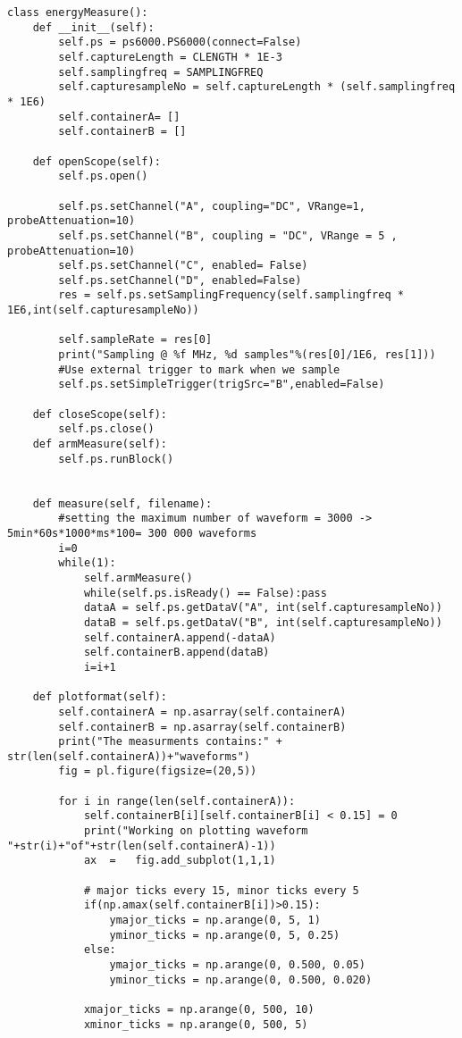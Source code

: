 \begin{appendices}
\begin{lstlisting}
class energyMeasure():
	def __init__(self):
		self.ps = ps6000.PS6000(connect=False)
		self.captureLength = CLENGTH * 1E-3
		self.samplingfreq = SAMPLINGFREQ
		self.capturesampleNo = self.captureLength * (self.samplingfreq * 1E6)
		self.containerA= []
		self.containerB = []
	
	def openScope(self):
		self.ps.open()

		self.ps.setChannel("A", coupling="DC", VRange=1, probeAttenuation=10)
		self.ps.setChannel("B", coupling = "DC", VRange = 5 , probeAttenuation=10)
		self.ps.setChannel("C", enabled= False)
		self.ps.setChannel("D", enabled=False)
		res = self.ps.setSamplingFrequency(self.samplingfreq * 1E6,int(self.capturesampleNo))

		self.sampleRate = res[0]
		print("Sampling @ %f MHz, %d samples"%(res[0]/1E6, res[1]))
		#Use external trigger to mark when we sample
		self.ps.setSimpleTrigger(trigSrc="B",enabled=False)

	def closeScope(self):
		self.ps.close()
	def armMeasure(self):
		self.ps.runBlock()


	def measure(self, filename):
		#setting the maximum number of waveform = 3000 -> 5min*60s*1000*ms*100= 300 000 waveforms
		i=0
		while(1):
			self.armMeasure()
			while(self.ps.isReady() == False):pass
			dataA = self.ps.getDataV("A", int(self.capturesampleNo))
			dataB = self.ps.getDataV("B", int(self.capturesampleNo))
			self.containerA.append(-dataA)
			self.containerB.append(dataB)
			i=i+1

	def plotformat(self):
		self.containerA = np.asarray(self.containerA)
		self.containerB = np.asarray(self.containerB)
		print("The measurments contains:" + str(len(self.containerA))+"waveforms")                                                   
		fig	= pl.figure(figsize=(20,5))
		
		for i in range(len(self.containerA)):
			self.containerB[i][self.containerB[i] < 0.15] = 0
			print("Working on plotting waveform "+str(i)+"of"+str(len(self.containerA)-1))  
			ax 	= 	fig.add_subplot(1,1,1)

			# major ticks every 15, minor ticks every 5
			if(np.amax(self.containerB[i])>0.15):
				ymajor_ticks = np.arange(0, 5, 1)
				yminor_ticks = np.arange(0, 5, 0.25)
			else:
				ymajor_ticks = np.arange(0, 0.500, 0.05)                                              
				yminor_ticks = np.arange(0, 0.500, 0.020)
			
			xmajor_ticks = np.arange(0, 500, 10)                                              
			xminor_ticks = np.arange(0, 500, 5)


\end{lstlisting}
\end{appendices}
